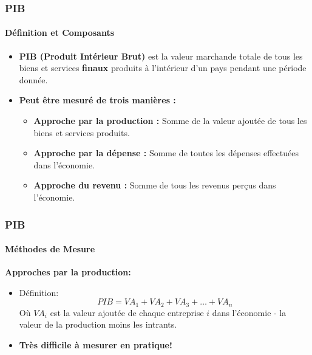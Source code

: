 \documentclass{beamer}
\begin{document}
\begin{frame}
    \frametitle{PIB}
    \framesubtitle{Définition et Composants}
        \begin{itemize}
            \item \textbf{PIB (Produit Intérieur Brut)} est la valeur marchande totale de tous les biens 
            et services \textbf{finaux} produits à l'intérieur d'un pays pendant une période donnée.
            \item \textbf{Peut être mesuré de trois manières :}
            \begin{itemize}
                \item \textbf{Approche par la production :} 
                Somme de la valeur ajoutée de tous les biens et services produits.
                \item \textbf{Approche par la dépense :} 
                Somme de toutes les dépenses effectuées dans l'économie.
                \item \textbf{Approche du revenu :} 
                Somme de tous les revenus perçus dans l'économie.
        \end{itemize}
    \end{itemize}
\end{frame}


\begin{frame}
    \frametitle{PIB}
    \framesubtitle{Méthodes de Mesure}
        \textbf{Approches par la production:}
        \begin{itemize}
            \item Définition:
            \begin{equation}
                PIB = VA_1 + VA_2 + VA_3 + \ldots + VA_n
            \end{equation}
            Où $VA_i$ est la valeur ajoutée de chaque entreprise $i$
            dans l'économie - la valeur de la production moins les intrants.
            \pause
            \item \textbf{ Tr\`es difficile à mesurer en pratique!}
        \end{itemize}
        
\end{frame}
\end{document}
